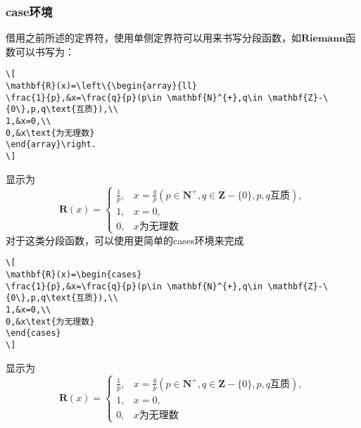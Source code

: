 \subsubsection{case环境}
借用之前所述的定界符，使用单侧定界符可以用来书写分段函数，如$\textbf{Riemann}$函数可以书写为：
\begin{verbatim}
\[
\mathbf{R}(x)=\left\{\begin{array}{ll}
\frac{1}{p},&x=\frac{q}{p}(p\in \mathbf{N}^{+},q\in \mathbf{Z}-\{0\},p,q\text{互质}),\\
1,&x=0,\\
0,&x\text{为无理数}
\end{array}\right.
\]
\end{verbatim}
显示为
\[
\mathbf{R}(x)=\left\{\begin{array}{ll}
\frac{1}{p},&x=\frac{q}{p}(p\in \mathbf{N}^{+},q\in \mathbf{Z}-\{0\},p,q\text{互质}),\\
1,&x=0,\\
0,&x\text{为无理数}
\end{array}\right.
\]
对于这类分段函数，可以使用更简单的cases环境来完成
\begin{verbatim}
\[
\mathbf{R}(x)=\begin{cases}
\frac{1}{p},&x=\frac{q}{p}(p\in \mathbf{N}^{+},q\in \mathbf{Z}-\{0\},p,q\text{互质}),\\
1,&x=0,\\
0,&x\text{为无理数}
\end{cases}
\]
\end{verbatim}
显示为
\[
\mathbf{R}(x)=\begin{cases}
\frac{1}{p},&x=\frac{q}{p}(p\in \mathbf{N}^{+},q\in \mathbf{Z}-\{0\},p,q\text{互质}),\\
1,&x=0,\\
0,&x\text{为无理数}
\end{cases}
\]